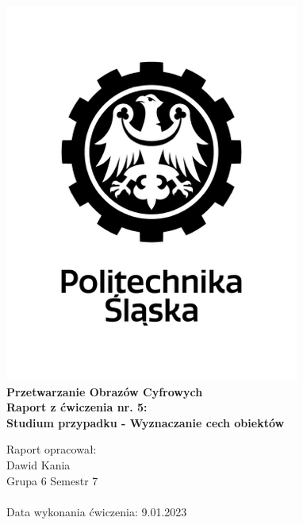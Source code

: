
\begin{titlepage}
    \begin{center}
        \includegraphics[width=.50\linewidth]{other/polsl.png}\\
        \Huge
        \textbf{Przetwarzanie Obrazów Cyfrowych}
        \\ \vspace{1.5cm}
        \Large
        \textbf{Raport z ćwiczenia nr. 5: } \\
        \textbf{Studium przypadku - Wyznaczanie cech obiektów}    
    \end{center}
    \vspace{2.5cm}
    \Large
    Raport opracował: \\
    Dawid Kania \\
    Grupa 6 Semestr 7 \\ \\
    Data wykonania ćwiczenia: 9.01.2023
\end{titlepage}
